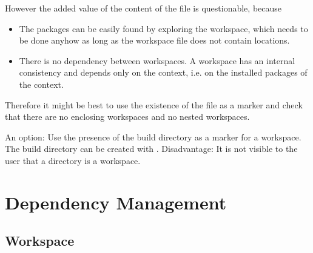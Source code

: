 However the added value of the content of the file is questionable, because
\begin{itemize}

\item The packages can be easily found by exploring the workspace, which needs
  to be done anyhow as long as the workspace file does not contain locations.

\item There is no dependency between workspaces. A workspace has an internal
  consistency and depends only on the context, i.e. on the installed packages
  of the context.
\end{itemize}

Therefore it might be best to use the existence of the file as a marker and
check that there are no enclosing workspaces and no nested workspaces.

An option: Use the presence of the build directory  as a
marker for a workspace. The build directory can be created with . Disadvantage: It is not visible to the user that a
directory is a workspace.




\section{Dependency Management}


\subsection{Workspace}

